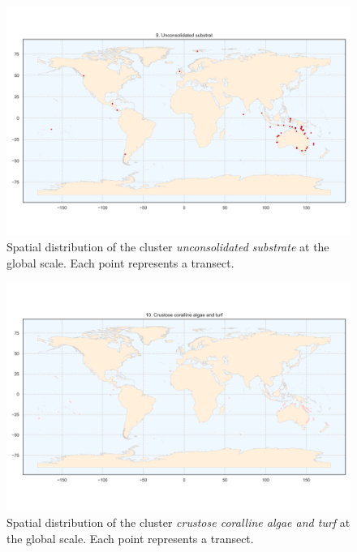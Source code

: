 \begin{figure}
\hypertarget{fig:chap2figS11}{%
\centering
\includegraphics{03-Chapitre2/figures/supplementary/06-spatial-cluster_distribution_cluster_8.png}
\caption{Spatial distribution of the cluster \emph{unconsolidated
substrate} at the global scale. Each point represents a
transect.}\label{fig:chap2figS11}
}
\end{figure}

\begin{figure}
\hypertarget{fig:chap2figS12}{%
\centering
\includegraphics{03-Chapitre2/figures/supplementary/06-spatial-cluster_distribution_cluster_9.png}
\caption{Spatial distribution of the cluster \emph{crustose coralline
algae and turf} at the global scale. Each point represents a
transect.}\label{fig:chap2figS12}
}
\end{figure}

